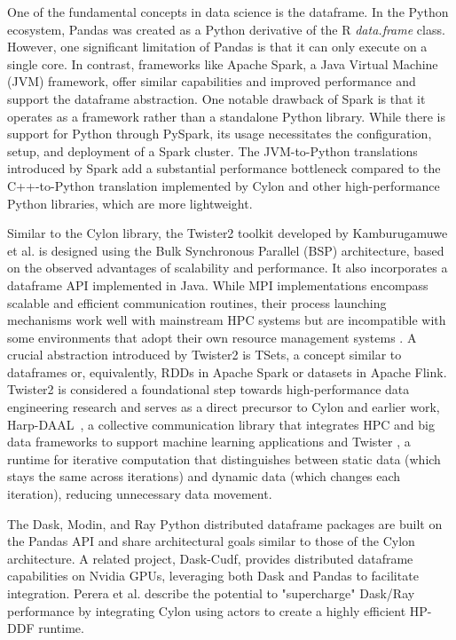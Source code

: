 \documentclass[conference]{IEEEtran}
\begin{document}
One of the fundamental concepts in data science is the dataframe. In the Python ecosystem, Pandas\cite{mckinney2011pandas} was created as a Python derivative of the R \textit{data.frame} class. However, one significant limitation of Pandas is that it can only execute on a single core. In contrast, frameworks like Apache Spark, a Java Virtual Machine (JVM) framework, offer similar capabilities and improved performance and support the dataframe abstraction. One notable drawback of Spark is that it operates as a framework rather than a standalone Python library. While there is support for Python through PySpark, its usage necessitates the configuration, setup, and deployment of a Spark cluster. The JVM-to-Python translations introduced by Spark add a substantial performance bottleneck compared to the C++-to-Python translation implemented by Cylon and other high-performance Python libraries, which are more lightweight\cite{abeykoon2020data}.

Similar to the Cylon library, the Twister2 toolkit developed by Kamburugamuwe et al. is designed using the Bulk Synchronous Parallel (BSP) architecture, based on the observed advantages of scalability and performance. It also incorporates a dataframe API implemented in Java\cite{perera2023depth}. While MPI implementations encompass scalable and efficient communication routines, their process launching mechanisms work well with mainstream HPC systems but are incompatible with some environments that adopt their own resource management systems \cite{shan2022hybrid}. A crucial abstraction introduced by Twister2 is TSets, a concept similar to dataframes or, equivalently, RDDs in Apache Spark or datasets in Apache Flink. Twister2 is considered a foundational step towards high-performance data engineering research and serves as a direct precursor to Cylon\cite{pererathesis} and earlier work, Harp-DAAL~\cite{Harp}, a collective communication library that integrates HPC and big data frameworks to support machine learning applications and Twister \cite{ekanayake2010twister}, a runtime for iterative computation that distinguishes between static data (which stays the same across iterations) and dynamic data (which changes each iteration), reducing unnecessary data movement.

The Dask, Modin, and Ray Python distributed dataframe packages are built on the Pandas API and share architectural goals similar to those of the Cylon architecture. A related project, Dask-Cudf, provides distributed dataframe capabilities on Nvidia GPUs, leveraging both Dask and Pandas to facilitate integration.  Perera et al. describe the potential to "supercharge" Dask/Ray performance by integrating Cylon using actors to create a highly efficient HP-DDF runtime\cite{perera2023supercharging}.
\end{document}
